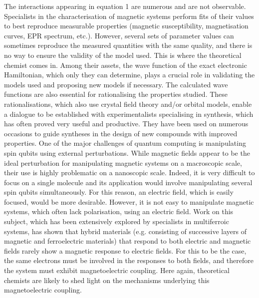 \documentclass[12pt]{report}
\numberwithin{equation}{section}
\begin{document}
The interactions appearing in equation 1 are numerous and are not observable.
Specialists in the characterisation of magnetic systems perform fits of their values to best reproduce measurable properties (magnetic susceptibility, magnetisation curves, EPR spectrum, etc.).
However, several sets of parameter values can sometimes reproduce the measured quantities with the same quality, and there is no way to ensure the validity of the model used.
This is where the theoretical chemist comes in.
Among their assets, the wave function of the exact electronic Hamiltonian, which only they can determine, plays a crucial role in validating the models used and proposing new models if necessary.
The calculated wave functions are also essential for rationalising the properties studied.
These rationalisations, which also use crystal field theory and/or orbital models, enable a dialogue to be established with experimentalists specialising in synthesis, which has often proved very useful and productive.
They have been used on numerous occasions to guide syntheses in the design of new compounds with improved properties. 
One of the major challenges of quantum computing is manipulating spin qubits using external perturbations.
While magnetic fields appear to be the ideal perturbation for manipulating magnetic systems on a macroscopic scale, their use is highly problematic on a nanoscopic scale.
Indeed, it is very difficult to focus on a single molecule and its application would involve manipulating several spin qubits simultaneously.
For this reason, an electric field, which is easily focused, would be more desirable.
However, it is not easy to manipulate magnetic systems, which often lack polarisation, using an electric field.
Work on this subject, which has been extensively explored by specialists in multiferroic systems, has shown that hybrid materials (e.g. consisting of successive layers of magnetic and ferroelectric materials) that respond to both electric and magnetic fields rarely show a magnetic response to electric fields.
For this to be the case, the same electrons must be involved in the responses to both fields, and therefore the system must exhibit magnetoelectric coupling.
Here again, theoretical chemists are likely to shed light on the mechanisms underlying this magnetoelectric coupling.  
\end{document}

